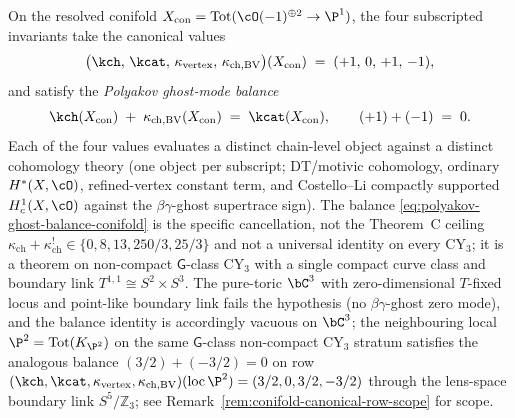 \begin{theorem}
\label{thm:conifold-polyakov-ghost-balance}
On the resolved conifold $X_{\mathrm{con}} =
\mathrm{Tot}(\cO(-1)^{\oplus 2} \to \P^1)$, the four
subscripted invariants take the canonical values
\[
 \bigl(\kch,\, \kcat,\, \kappa_{\mathrm{vertex}},\, \kchBV\bigr)(X_{\mathrm{con}})
 \;=\; (+1,\,0,\,+1,\,-1),
\]
and satisfy the \emph{Polyakov ghost-mode balance}
\begin{equation}
\label{eq:polyakov-ghost-balance-conifold}
 \kch(X_{\mathrm{con}}) \;+\; \kchBV(X_{\mathrm{con}})
 \;=\; \kcat(X_{\mathrm{con}}),
 \qquad (+1) + (-1) \;=\; 0.
\end{equation}
Each of the four values evaluates a distinct chain-level object
against a distinct cohomology theory (one object per subscript;
DT/motivic cohomology, ordinary $H^*(X, \cO)$, refined-vertex
constant term, and Costello--Li compactly
supported $H^1_c(X, \cO)$ against the $\beta\gamma$-ghost
supertrace sign). The balance
\eqref{eq:polyakov-ghost-balance-conifold} is the specific
cancellation, not the Theorem~C ceiling
$\kappa_{\mathrm{ch}} + \kappa_{\mathrm{ch}}^!
\in \{0, 8, 13, 250/3, 25/3\}$ and not a universal identity on
every CY$_3$; it is a theorem on non-compact $\mathsf{G}$-class
CY$_3$ with a single compact curve class and boundary link
$T^{1,1} \cong S^2 \times S^3$. The pure-toric $\bC^3$ with
zero-dimensional $T$-fixed locus and point-like boundary
link fails the hypothesis (no $\beta\gamma$-ghost zero mode),
and the balance identity is accordingly vacuous on $\bC^3$; the
neighbouring local $\P^2 = \mathrm{Tot}(K_{\P^2})$ on the same
$\mathsf{G}$-class non-compact CY$_3$ stratum satisfies the
analogous balance $(3/2) + (-3/2) = 0$ on row $(\kch, \kcat,
\kappa_{\mathrm{vertex}}, \kchBV)(\mathrm{loc}\,\P^2) = (3/2, 0, 3/2, -3/2)$
through the lens-space boundary link $S^5/\mathbb{Z}_3$;
see Remark~\ref{rem:conifold-canonical-row-scope} for scope.
\end{theorem}

